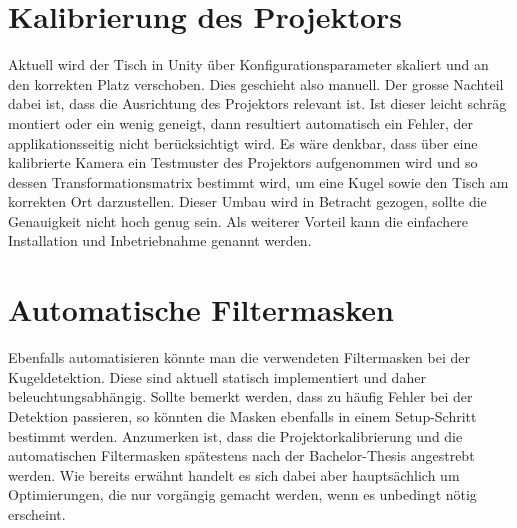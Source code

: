 \section{Kalibrierung des Projektors}
Aktuell wird der Tisch in Unity über Konfigurationsparameter skaliert und an den korrekten Platz verschoben. Dies
geschieht also manuell. Der grosse Nachteil dabei ist, dass die Ausrichtung des Projektors relevant ist. Ist dieser leicht
schräg montiert oder ein wenig geneigt, dann resultiert automatisch ein Fehler, der applikationsseitig nicht berücksichtigt
wird. Es wäre denkbar, dass über eine kalibrierte Kamera ein Testmuster des Projektors aufgenommen wird und so dessen
Transformationsmatrix bestimmt wird, um eine Kugel sowie den Tisch am korrekten Ort darzustellen. Dieser Umbau wird in
Betracht gezogen, sollte die Genauigkeit nicht hoch genug sein. Als weiterer Vorteil kann die einfachere Installation
und Inbetriebnahme genannt werden.
\section{Automatische Filtermasken}
Ebenfalls automatisieren könnte man die verwendeten Filtermasken bei der Kugeldetektion. Diese sind aktuell statisch
implementiert und daher beleuchtungsabhängig. Sollte bemerkt werden, dass zu häufig Fehler bei der Detektion passieren,
so könnten die Masken ebenfalls in einem Setup-Schritt bestimmt werden. Anzumerken ist, dass die Projektorkalibrierung
und die automatischen Filtermasken spätestens nach der Bachelor-Thesis angestrebt werden. Wie bereits erwähnt handelt
es sich dabei aber hauptsächlich um Optimierungen, die nur vorgängig gemacht werden, wenn es unbedingt nötig erscheint.
